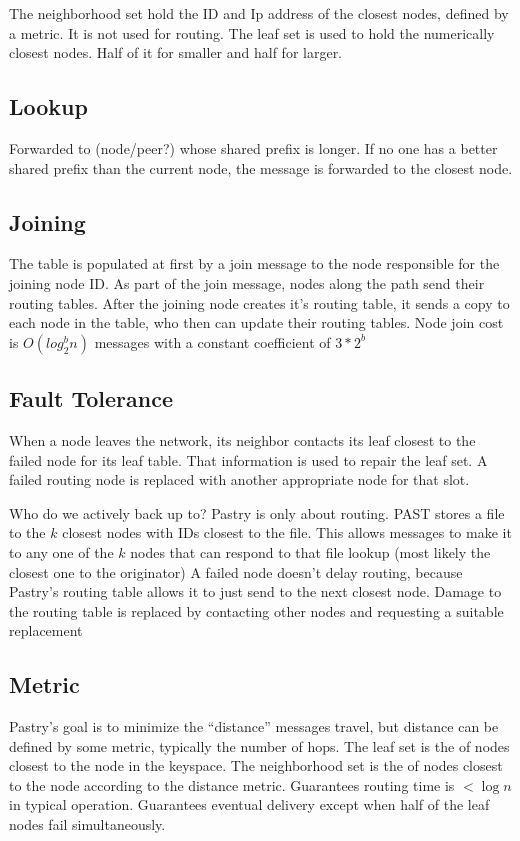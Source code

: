 \documentclass[10pt,letterpaper]{report}
\begin{document}
The neighborhood set hold the ID and Ip address of the closest nodes, defined by a metric.  It is not used for routing.  The leaf set is used to hold the numerically closest nodes. Half of it for smaller and half for larger.


\subsection*{Lookup}
Forwarded to (node/peer?) whose shared prefix is longer.  If no one  has a better shared prefix than the current node, the message is forwarded to the closest  node.




\subsection*{Joining}
The table is populated at first by a join message to the node responsible for the joining node ID.  
As part of the join message, nodes  along the path send their routing tables.  
After the joining node creates it's routing table, it sends a copy to each node in the table, who then can update their routing tables.   
Node join cost is $O(log_2^b n)$ messages  with  a constant  coefficient  of $3*2^b$




\subsection*{Fault Tolerance}

When a node leaves the network, its neighbor contacts its leaf closest to the failed node  for its leaf table.  That information is used to repair the leaf set.  A failed routing node is replaced with another appropriate node for that slot.  

Who do we actively back up to? 
Pastry is only about routing.
PAST stores a file to the $k$ closest nodes with IDs closest to the file.  
This allows messages to make it to any one of the $k$ nodes that can respond to that file lookup (most likely the closest one to the originator)
A failed node doesn't delay  routing, because Pastry's routing table allows it to just send to the next closest node.  
Damage to the routing table is replaced by contacting other nodes and requesting a suitable replacement




\subsection*{Metric}
Pastry's goal is to minimize the ``distance'' messages travel, but distance can be defined by some metric, typically the number of hops.
The leaf set is the  of nodes closest to the node in the keyspace.  
The neighborhood set is the of nodes closest to the node according to the distance metric. 
Guarantees routing time is  $<\log n$ in typical operation.  
Guarantees eventual delivery except when half of the leaf nodes fail simultaneously.
\end{document}
